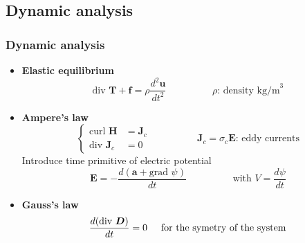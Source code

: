 \documentclass[compress]{beamer}
\begin{document}
\subsection{Dynamic analysis}
\begin{frame}\frametitle{Dynamic analysis}
\begin{itemize}[label=$\bullet$, font=\small, leftmargin=*]
\item \textbf{Elastic equilibrium}
\begin{equation*}
	\text{div }\boldsymbol{T} + \boldsymbol{f} = \rho \frac{d^2 \boldsymbol{u}}{dt^2}
	\hspace{2cm} \rho \text{: density kg/m}^3
	\end{equation*}

\item \textbf{Ampere's law}
\begin{equation*}
				\left\{ 
				\begin{aligned}
				\text{curl } \boldsymbol{H} & = \boldsymbol{J}_c \\
				\text{div } \boldsymbol{J}_c & = 0
        		\end{aligned}
				\right.
				\hspace{2cm} \boldsymbol{J}_c = \sigma_c \boldsymbol{E} \text{: eddy currents}
	\end{equation*}
Introduce time primitive of electric potential
\begin{equation*}
\boldsymbol{E} = - \frac{d(\boldsymbol{a}+ \text{grad }\psi)}{dt}
\hspace{2cm} \text{with } V=\frac{d \psi}{dt}
\end{equation*}
\item \textbf{Gauss's law}
\begin{equation*}
\frac{d(\text{div } \boldsymbol{D})}{dt} = 0
\hspace{0.5cm} \text{for the symetry of the system} 
\end{equation*}
\end{itemize}
\end{frame}
\end{document}

